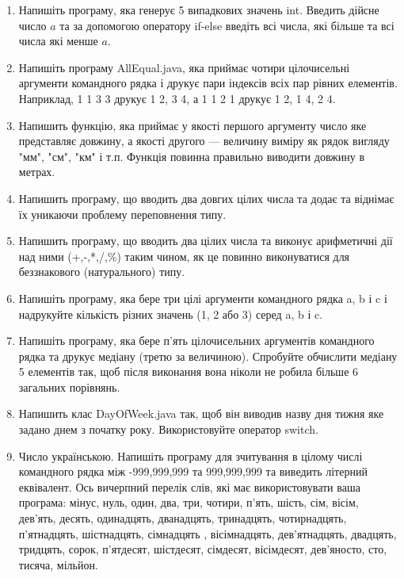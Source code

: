 \documentclass[]{article}
\begin{document}
\begin{enumerate}
\def\labelenumi{3.\arabic{enumi}.}

\item
Напишіть програму, яка генерує 5 випадкових значень int. 
Введить дійсне число $a$ та за допомогою оператору if-else введіть всі числа, які більше та всі числа які менше $a$.

\item
Напишіть програму AllEqual.java, яка приймає чотири цілочисельні аргументи командного рядка і 
друкує пари індексів всіх пар рівних елементів. Наприклад, 1 1 3 3 друкує 1 2, 3 4, а 1 1 2 1 друкує 1 2, 1 4, 2 4.

\item
Напишить функцію, яка приймає у якості першого аргументу число яке представляє довжину, 
а якості другого --- величину виміру як рядок вигляду "мм", "см", "км" і т.п. 
Функція повинна правильно виводити довжину в метрах.

\item Напишить програму, що вводить два довгих цілих числа та додає та віднімає їх уникаючи проблему переповнення типу.
\item Напишить програму, що вводить два цілих числа та виконує арифметичні дії над ними (+,-,*,/,\%) таким чином, як це повинно виконуватися для беззнакового (натурального) типу.

\item Напишіть програму, яка бере три цілі аргументи командного рядка a, b і c і надрукуйте кількість різних значень (1, 2 або 3) серед a, b і c.

\item Напишіть програму, яка бере п'ять цілочисельних аргументів командного рядка та друкує медіану (третю за величиною).
Спробуйте обчислити медіану 5 елементів так, щоб після виконання вона ніколи не робила більше 6 загальних порівнянь.

\item Напишить клас DayOfWeek.java так, щоб він виводив назву дня тижня яке задано днем з початку року.
Використовуйте оператор switch.
\item Число українською.
Напишіть програму для зчитування в цілому числі командного рядка між -999,999,999 та 999,999,999 та виведить літерний еквівалент.
 Ось вичерпний перелік слів, які має використовувати ваша програма:
 мінус, нуль, один, два, три, чотири, п’ять, шість, сім, вісім, дев’ять, десять, одинадцять, дванадцять, тринадцять, чотирнадцять, п’ятнадцять, шістнадцять, сімнадцять , вісімнадцять, дев’ятнадцять, двадцять, тридцять, сорок, п’ятдесят, шістдесят, сімдесят, вісімдесят, дев’яносто, сто, тисяча, мільйон.


\end{enumerate}
\end{document}
